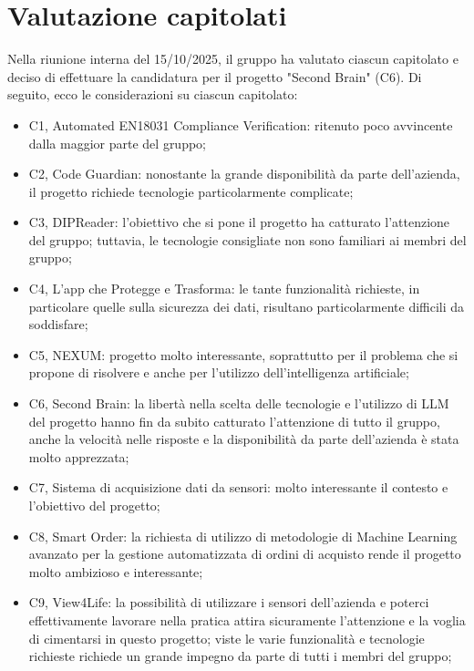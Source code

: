 \documentclass[a4paper,10pt]{article}
\begin{document}
\newpage


\section*{Valutazione capitolati}
Nella riunione interna del 15/10/2025, il gruppo ha valutato ciascun capitolato e deciso di effettuare la candidatura per il progetto "Second Brain" (C6). Di seguito, ecco le considerazioni su ciascun capitolato:
\begin{itemize}
    \item C1, Automated EN18031 Compliance Verification: ritenuto poco avvincente dalla maggior parte del gruppo;
    \par
    \item C2, Code Guardian: nonostante la grande disponibilità da parte dell'azienda, il progetto richiede tecnologie particolarmente complicate;
    \item C3, DIPReader: l'obiettivo che si pone il progetto ha catturato l'attenzione del gruppo; tuttavia, le tecnologie consigliate non sono familiari ai membri del gruppo;
    \item C4, L'app che Protegge e Trasforma: le tante funzionalità richieste, in particolare quelle sulla sicurezza dei dati, risultano particolarmente difficili da soddisfare;
    \item C5, NEXUM: progetto molto interessante, soprattutto per il problema che si propone di risolvere e anche per l'utilizzo dell'intelligenza artificiale;
    \item C6, Second Brain: la libertà nella scelta delle tecnologie e l'utilizzo di LLM del progetto hanno fin da subito catturato l'attenzione di tutto il gruppo, anche la velocità nelle risposte e la disponibilità da parte dell'azienda è stata molto apprezzata;
    \item C7, Sistema di acquisizione dati da sensori: molto interessante il contesto e l'obiettivo del progetto;
    \item C8, Smart Order: la richiesta di utilizzo di metodologie di Machine Learning avanzato per la gestione automatizzata di ordini di acquisto rende il progetto molto ambizioso e interessante;
    \item C9, View4Life: la possibilità di utilizzare i sensori dell'azienda e poterci effettivamente lavorare nella pratica attira sicuramente l'attenzione e la voglia di cimentarsi in questo progetto; viste le varie funzionalità e tecnologie richieste richiede un grande impegno da parte di tutti i membri del gruppo;
\end{itemize}
\end{document}
